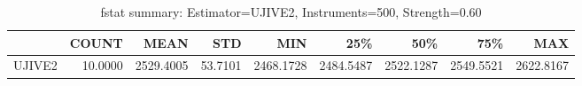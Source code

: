 \begin{table}[ht]
\centering
\caption{fstat summary: Estimator=UJIVE2, Instruments=500, Strength=0.60}
\begin{tabular}{lrrrrrrrr}
\toprule
 & COUNT & MEAN & STD & MIN & 25\% & 50\% & 75\% & MAX \\
\midrule
UJIVE2 & 10.0000 & 2529.4005 & 53.7101 & 2468.1728 & 2484.5487 & 2522.1287 & 2549.5521 & 2622.8167 \\
\bottomrule
\end{tabular}
\end{table}

